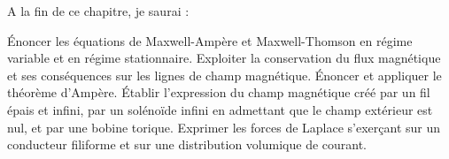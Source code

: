 A la fin de ce chapitre, je saurai :
\begin{competences}
  \point Énoncer les équations de Maxwell-Ampère et Maxwell-Thomson en régime variable et en régime stationnaire.
  \point Exploiter la conservation du flux magnétique et ses conséquences sur les lignes de champ magnétique.
  \point Énoncer et appliquer le théorème d'Ampère.
  \point Établir l'expression du champ magnétique créé par un fil épais et infini, par un solénoïde infini en admettant que le champ extérieur est nul, et par une bobine torique.
  \point Exprimer les forces de Laplace s’exerçant sur un conducteur filiforme et sur une distribution volumique de courant.
\end{competences}
